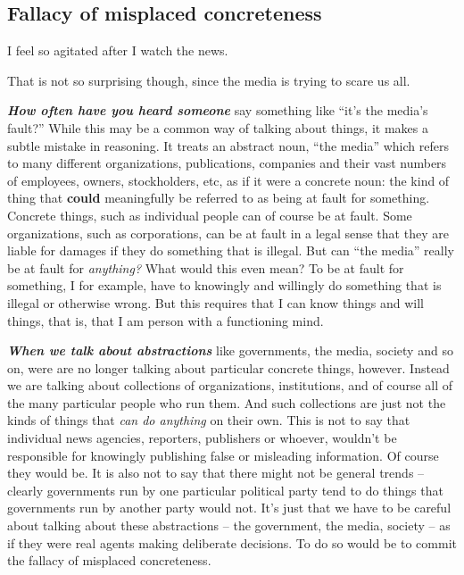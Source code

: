 \documentclass[
  12pt, openany]{book}
\theoremstyle{definition}
\theoremstyle{definition}
\theoremstyle{definition}
\theoremstyle{definition}
\theoremstyle{remark}
\begin{document}
\hypertarget{fallacy-of-misplaced-concreteness}{%
\subsection*{Fallacy of misplaced concreteness}\label{fallacy-of-misplaced-concreteness}}


\begin{center}

\begin{argument}
I feel so agitated after I watch the news.

That is not so surprising though, since the media is trying to scare us all.

\end{argument}


\end{center}

\textbf{\emph{How often have you heard someone}} say something like ``it's the media's fault?'' While this may be a common way of talking about things, it makes a subtle mistake in reasoning. It treats an abstract noun, ``the media'' which refers to many different organizations, publications, companies and their vast numbers of employees, owners, stockholders, etc, as if it were a concrete noun: the kind of thing that \textbf{could} meaningfully be referred to as being at fault for something. Concrete things, such as individual people can of course be at fault. Some organizations, such as corporations, can be at fault in a legal sense that they are liable for damages if they do something that is illegal. But can ``the media'' really be at fault for \emph{anything?} What would this even mean? To be at fault for something, I for example, have to knowingly and willingly do something that is illegal or otherwise wrong. But this requires that I can know things and will things, that is, that I am person with a functioning mind.

\textbf{\emph{When we talk about abstractions}} like governments, the media, society and so on, were are no longer talking about particular concrete things, however. Instead we are talking about collections of organizations, institutions, and of course all of the many particular people who run them. And such collections are just not the kinds of things that \emph{can do anything} on their own. This is not to say that individual news agencies, reporters, publishers or whoever, wouldn't be responsible for knowingly publishing false or misleading information. Of course they would be. It is also not to say that there might not be general trends -- clearly governments run by one particular political party tend to do things that governments run by another party would not. It's just that we have to be careful about talking about these abstractions -- the government, the media, society -- as if they were real agents making deliberate decisions. To do so would be to commit the fallacy of misplaced concreteness.
\end{document}
